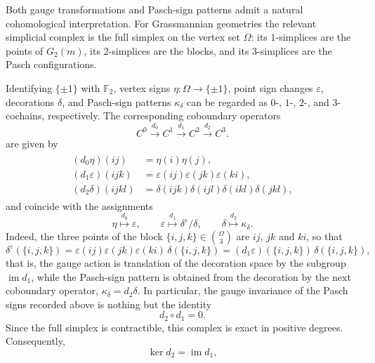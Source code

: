 \documentclass[times,11pt,reqno]{amsproc}
\theoremstyle{definition}
\numberwithin{equation}{section}
\begin{document}
Both gauge transformations and Pasch-sign patterns admit a natural cohomological
interpretation. For Grassmannian geometries the relevant simplicial
complex is the full simplex on the vertex set $\Omega$: its
$1$-simplices are the points of $G_2(m)$, its $2$-simplices are the
blocks, and its $3$-simplices are the Pasch configurations.

Identifying $\{\pm1\}$ with $\mathbb F_2$, vertex signs
$\eta:\Omega\to\{\pm1\}$, point sign changes $\varepsilon$,
decorations $\delta$, and Pasch-sign patterns $\kappa_\delta$
can be regarded as $0$-, $1$-, $2$-, and $3$-cochains, respectively. The corresponding
coboundary operators
\begin{equation}\label{ddef2}
C^0\stackrel{d_0}{\longrightarrow}
C^1\stackrel{d_1}{\longrightarrow}
C^2\stackrel{d_2}{\longrightarrow}
C^3 .
\end{equation}
are given by
\begin{align}\label{d0d1d2}
\begin{aligned}
(d_0\eta)(ij)
&=
\eta(i)\eta(j),\\
(d_1\varepsilon)(ijk)
&=
\varepsilon(ij)\varepsilon(jk)\varepsilon(ki),\\
(d_2\delta)(ijkl)
&=
\delta(ijk)\delta(ijl)\delta(ikl)\delta(jkl),
\end{aligned}
\end{align}
and coincide with the assignments
\begin{equation}\label{ddef1}
\eta\stackrel{d_0}{\longmapsto}\varepsilon,
\qquad
\varepsilon\stackrel{d_1}{\longmapsto}\delta^\varepsilon/\delta,
\qquad
\delta\stackrel{d_2}{\longmapsto}\kappa_\delta.
\end{equation}
Indeed, the three points of the block $\{i,j,k\}\in\binom{\Omega}{3}$ are
$ij$, $jk$ and $ki$, so that
$$
\delta^\varepsilon(\{i,j,k\})
=
\varepsilon(ij)\varepsilon(jk)\varepsilon(ki)\,
\delta(\{i,j,k\})
=
(d_1\varepsilon)(\{i,j,k\})\,\delta(\{i,j,k\}),
$$
that is, the gauge action is translation of the decoration space by the
subgroup $\operatorname{im}d_1$, while the Pasch-sign pattern is obtained
from the decoration by the next coboundary operator,
$\kappa_\delta=d_2\delta$. In particular, the gauge invariance of the
Pasch signs recorded above is nothing but the identity
\begin{equation}\label{d2d1eq}
d_2\circ d_1=0.
\end{equation}
Since the full simplex is contractible, this complex is exact in positive
degrees. Consequently,
\begin{equation}\label{rankd2}
\ker d_2=\operatorname{im}d_1,
\end{equation}
\end{document}
